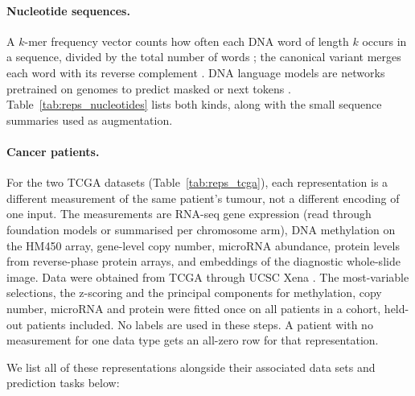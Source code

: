 \paragraph{Nucleotide sequences.} A $k$-mer frequency vector counts how often each DNA word of length $k$ occurs in a sequence, divided by the total number of words \citep{Vinga2003}; the canonical variant merges each word with its reverse complement \citep{Teeling2004}. DNA language models are networks pretrained on genomes to predict masked or next tokens \citep{Zhou2023DNABERT2, DallaTorre2025, Nguyen2023HyenaDNA}. Table~\ref{tab:reps_nucleotides} lists both kinds, along with the small sequence summaries used as augmentation.

\paragraph{Cancer patients.} For the two TCGA datasets (Table~\ref{tab:reps_tcga}), each representation is a different measurement of the same patient's tumour, not a different encoding of one input. The measurements are RNA-seq gene expression (read through foundation models or summarised per chromosome arm), DNA methylation on the HM450 array, gene-level copy number, microRNA abundance, protein levels from reverse-phase protein arrays, and embeddings of the diagnostic whole-slide image. Data were obtained from TCGA through UCSC Xena \citep{TCGA2013, Goldman2020}. The most-variable selections, the z-scoring and the principal components for methylation, copy number, microRNA and protein were fitted once on all patients in a cohort, held-out patients included. No labels are used in these steps. A patient with no measurement for one data type gets an all-zero row for that representation.

We list all of these representations alongside their associated data sets and prediction tasks below:

